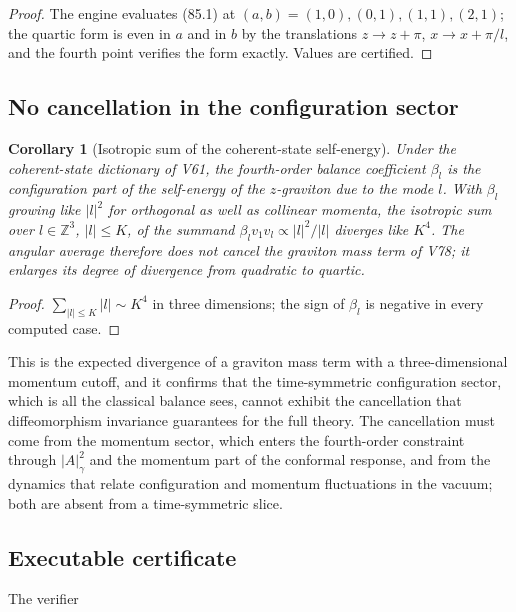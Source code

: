 \documentclass[11pt]{article}
\newtheorem{corollary}[theorem]{Corollary}
\theoremstyle{remark}
\begin{document}
\begin{proof}
The engine evaluates (85.1) at \((a,b)=(1,0),(0,1),(1,1),(2,1)\); the
quartic form is even in \(a\) and in \(b\) by the translations
\(z\to z+\pi\), \(x\to x+\pi/l\), and the fourth point verifies the
form exactly.  Values are certified.
\end{proof}

\subsection{No cancellation in the configuration sector}

\begin{corollary}[Isotropic sum of the coherent-state self-energy]
\label{cor:v19v82-no-cancel}
Under the coherent-state dictionary of V61, the fourth-order balance
coefficient \(\beta_l\) is the configuration part of the self-energy
of the \(z\)-graviton due to the mode \(l\).  With \(\beta_l\) growing
like \(|l|^2\) for orthogonal as well as collinear momenta, the
isotropic sum over \(l\in\mathbb Z^3\), \(|l|\leq K\), of the summand
\(\beta_lv_1v_l\propto|l|^2/|l|\) diverges like \(K^4\).  The angular
average therefore does not cancel the graviton mass term of V78; it
enlarges its degree of divergence from quadratic to quartic.
\end{corollary}

\begin{proof}
\(\sum_{|l|\leq K}|l|\sim K^4\) in three dimensions; the sign of
\(\beta_l\) is negative in every computed case.
\end{proof}

This is the expected divergence of a graviton mass term with a
three-dimensional momentum cutoff, and it confirms that the
time-symmetric configuration sector, which is all the classical
balance sees, cannot exhibit the cancellation that diffeomorphism
invariance guarantees for the full theory.  The cancellation must
come from the momentum sector, which enters the fourth-order
constraint through \(|A|^2_\gamma\) and the momentum part of the
conformal response, and from the dynamics that relate configuration
and momentum fluctuations in the vacuum; both are absent from a
time-symmetric slice.

\subsection{Executable certificate}

The verifier
\end{document}
